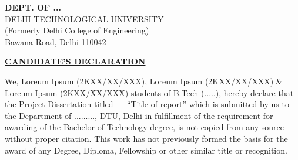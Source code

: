 \documentclass[12pt,a4paper]{report}
\begin{document}
\thispagestyle{empty}

\newpage



\newpage




\begin{center}


\begin{center}
\textbf{DEPT. OF ...}\\

DELHI TECHNOLOGICAL UNIVERSITY \\
(Formerly Delhi College of Engineering) \\
Bawana Road, Delhi-110042\\
\end{center}
\vspace{2 cm}
\textbf{\underline{CANDIDATE’S DECLARATION}}\\
\end{center}
\vspace{1.2cm}
We, Loreum Ipsum (2KXX/XX/XXX), Loreum Ipsum (2KXX/XX/XXX) \& Loreum Ipsum (2KXX/XX/XXX) students of B.Tech (.....), hereby declare that the Project Dissertation titled ― “Title of report” which is submitted by us to the Department of ........., DTU, Delhi in fulfillment of the requirement for awarding of the Bachelor of Technology degree, is not copied from any source without proper citation. This work has not previously formed the basis for the award of any Degree, Diploma, Fellowship or other similar title or recognition.


\end{document}
